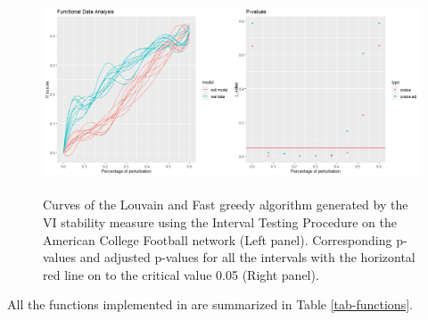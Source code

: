 \begin{figure}[h]
\centering
\includegraphics[width=.9\textwidth, height=6cm]{FDA.png}


\caption{Curves of the Louvain and Fast greedy algorithm generated by the VI stability measure using the Interval Testing Procedure on the American College Football network (Left panel). Corresponding p-values and adjusted p-values for all the intervals with the horizontal red line on to the critical value 0.05 (Right panel).}
\label{fig:PlotComparisonFDA}
\end{figure}

All the functions implemented in  are summarized in Table \ref{tab-functions}.


